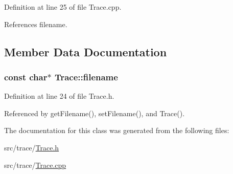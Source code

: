 Definition at line 25 of file Trace.\+cpp.



References filename.



\subsection{Member Data Documentation}
\hypertarget{classTrace_a0d9910fe66882cafb9617563b397a7b4}{}
\subsubsection[{filename}]{\setlength{\rightskip}{0pt plus 5cm}const char$\ast$ Trace\+::filename\hspace{0.3cm}{\ttfamily [private]}}\label{classTrace_a0d9910fe66882cafb9617563b397a7b4}


Definition at line 24 of file Trace.\+h.



Referenced by get\+Filename(), set\+Filename(), and Trace().



The documentation for this class was generated from the following files\+:\begin{DoxyCompactItemize}
\item 
src/trace/\hyperlink{Trace_8h}{Trace.\+h}\item 
src/trace/\hyperlink{Trace_8cpp}{Trace.\+cpp}\end{DoxyCompactItemize}
